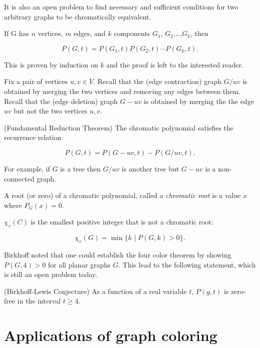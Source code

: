 It is also an open problem to find necessary and sufficient conditions
for two arbitrary graphs to be chromatically equivalent.

\begin{theorem}
If G has $n$ vertices, $m$ edges, and $k$ components $G_1$,
$G_2$,\dots ,$G_k$, then

\[
P(G, t) = P(G_1, t)P(G_2,t) \cdots P(G_k,t).
\]
\end{theorem}

This is proven by induction on $k$ and the proof is left to the
interested reader.

Fix a pair of vertices $u, v\in V$.
Recall that the (edge contraction)
graph $G/uv$ is obtained by merging the two vertices and removing
any edges between them. Recall that the (edge deletion)
graph $G-uv$ is obtained by merging the the edge $uv$ but not the
two vertices $u,v$.

\begin{theorem}
(Fundamental Reduction Theorem)
The chromatic polynomial satisfies the recurrence relation

\[
    P(G,t) = P(G-uv, t) - P(G/uv,t) .
\]
\end{theorem}

For example, if $G$ is a tree then $ G/uv$ is another tree
but $ G-uv$ is a non-connected graph.

A root (or zero) of a chromatic polynomial, called a {\it chromatic root}
is a value $x$ where $P_G(x)=0$.

\begin{theorem}
$\chi_v(C)$ is the smallest positive integer that is not a chromatic root:

\[
    \chi_v (G)=\min\{ k\,\ |\ P(G,k) > 0 \}.
\]
\end{theorem}

Birkhoff noted that one could establish the four color theorem by
showing $P(G,4)>0$ for all planar graphs $G$. This lead to the
following statement, which is still an open problem today.

\begin{conjecture}
(Birkhoff-Lewis Conjecture)
As a function of a real variable $t$, $P(g,t)$ is zero-free in the
interval $t\geq 4$.
\end{conjecture}




\section{Applications of graph coloring}

